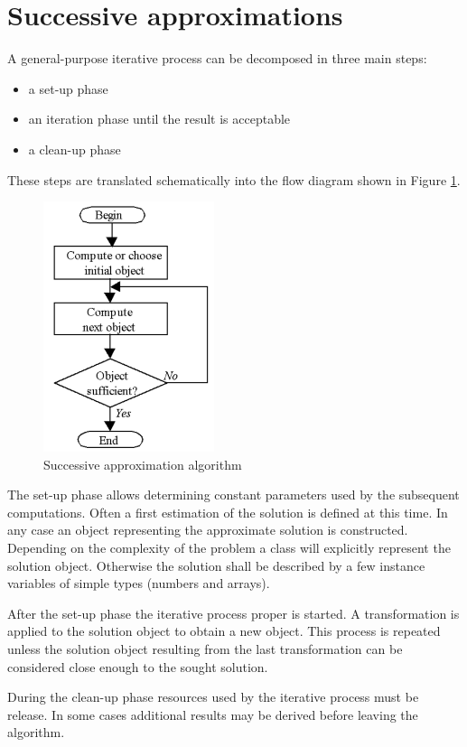 \section{Successive approximations}
\label{sec:iteration} A general-purpose iterative process can be
decomposed in three main steps:
\begin{itemize}
  \item a set-up phase
  \item an iteration phase until the result is acceptable
  \item a clean-up phase
\end{itemize}
\noindent These steps are translated schematically into the flow
diagram shown in Figure \ref{fig:itercoarse}.
\begin{figure}
\centering\includegraphics[width=5cm]{Figures/IterationCoarseFlow}
\caption{Successive approximation algorithm}\label{fig:itercoarse}
\end{figure}

The set-up phase allows determining constant parameters used by
the subsequent computations. Often a first estimation of the
solution is defined at this time. In any case an object
representing the approximate solution is constructed. Depending on
the complexity of the problem a class will explicitly represent
the solution object. Otherwise the solution shall be described by
a few instance variables of simple types (numbers and arrays).

After the set-up phase the iterative process proper is started. A
transformation is applied to the solution object to obtain a new
object. This process is repeated unless the solution object
resulting from the last transformation can be considered close
enough to the sought solution.

During the clean-up phase resources used by the iterative process
must be release. In some cases additional results may be derived
before leaving the algorithm.

